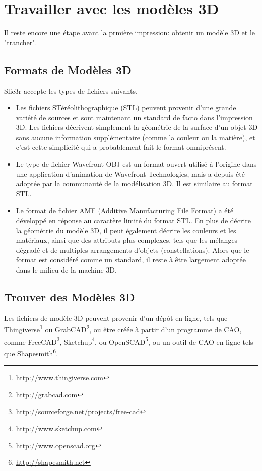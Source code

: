 \section{Travailler avec les modèles 3D}
\label{sub:working_with_models}

Il reste encore une étape avant la prmière impression: obtenir un modèle 3D et le "trancher".

\subsection{Formats de Modèles 3D} %
\label{sub:model_formats}

Slic3r accepte les types de fichiers suivants.

\begin{itemize}
	\item Les fichiers STéréolithographique (STL) peuvent provenir d'une grande variété de sources et sont maintenant un standard de facto dans l'impression 3D. Les fichiers décrivent simplement la géométrie de la surface d'un objet 3D sans aucune information supplémentaire (comme la couleur ou la matière), et c'est cette simplicité qui a probablement fait le format omniprésent.
	\item Le type de fichier Wavefront OBJ est un format ouvert utilisé à l'origine dans une application d'animation de Wavefront Technologies, mais a depuis été adoptée par la communauté de la modélisation 3D. Il est similaire au format STL.
	\item Le format de fichier AMF (Additive Manufacturing File Format) a été développé en réponse au caractère limité du format STL. En plus de décrire la géométrie du modèle 3D, il peut également décrire les couleurs et les matériaux, ainsi que des attributs plus complexes, tels que les mélanges dégradé et de multiples arrangements d'objets (constellations). Alors que le format est considéré comme un standard, il reste à être largement adoptée dans le milieu de la machine 3D.
\end{itemize}

\subsection{Trouver des Modèles 3D} %
\label{sub:finding_models}

Les fichiers de modèle 3D peuvent provenir d'un dépôt en ligne, tels que Thingiverse\footnote{\url{http://www.thingiverse.com}} ou GrabCAD\footnote{\url{http://grabcad.com}}, ou être créée à partir d'un programme de CAO, comme FreeCAD\footnote{\url{http://sourceforge.net/projects/free-cad}}, Sketchup\footnote{\url{http://www.sketchup.com}}, ou OpenSCAD\footnote{\url{http://www.openscad.org}}, ou un outil de CAO en ligne tels que Shapesmith\footnote{\url{http://shapesmith.net}}.


